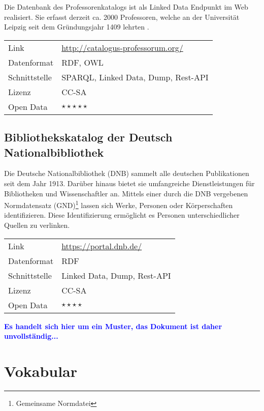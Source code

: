 \documentclass[a4paper,10pt,parskip]{article}
\begin{document}
Die Datenbank des Professorenkatalogs ist als Linked Data Endpunkt im Web realisiert. Sie erfasst derzeit ca. 2000 Professoren, welche an der Universität Leipzig seit dem Gründungsjahr 1409 lehrten \cite{riechert_knowledge_2010}.

\vspace{0.5cm}
\begin{tabular}{l|p{9cm}}
	Link & \url{http://catalogus-professorum.org/} \\
 	Datenformat & RDF, OWL \\
 	Schnittstelle & SPARQL, Linked Data, Dump, Rest-API \\
 	Lizenz & CC-SA \\
 	Open Data & $\star\star\star\star\star$ \\
\end{tabular}

\subsection{Bibliothekskatalog der Deutsch Nationalbibliothek}

Die Deutsche Nationalbibliothek (DNB) sammelt alle deutschen Publikationen seit dem Jahr 1913. Darüber hinaus bietet sie umfangreiche Dienstleistungen für Bibliotheken und Wissenschaftler an. Mittels einer durch die DNB vergebenen Normdatensatz (GND)\footnote{Gemeinsame Normdatei} lassen sich Werke, Personen oder Körperschaften identifizieren. Diese Identifizierung ermöglicht es Personen unterschiedlicher Quellen zu verlinken.

\vspace{0.5cm}
\begin{tabular}{l|p{9cm}}
	Link & \url{https://portal.dnb.de/} \\
 	Datenformat & RDF \\
 	Schnittstelle & Linked Data, Dump, Rest-API \\
 	Lizenz & CC-SA \\
 	Open Data & $\star\star\star\star$ \\
\end{tabular}

\vspace{0.5cm}\textcolor{blue}{\textbf{Es handelt sich hier um ein Muster, das Dokument ist daher unvollständig...}}

\section{Vokabular}
\end{document}
